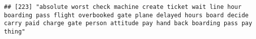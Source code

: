 \documentclass[
]{article}
\begin{document}
\begin{verbatim}
## [223] "absolute worst check machine create ticket wait line hour boarding pass flight overbooked gate plane delayed hours board decide carry paid charge gate person attitude pay hand back boarding pass pay thing"                                                                                                                                                                                                                                                                                                                                                                                                                                                                                                                                                                                                                                                                                                                                                                                                                                                                                                                                                                                                                                                                                                                                                                                                                                                                                                                                                                                                                                                                                                                                                                                  

\end{verbatim}
\end{document}
